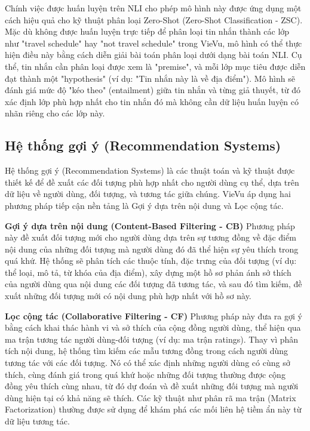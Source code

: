  Chính việc được huấn luyện trên NLI cho phép mô hình này được ứng dụng một cách hiệu quả cho kỹ thuật phân loại Zero-Shot (Zero-Shot Classification - ZSC). Mặc dù không được huấn luyện trực tiếp để phân loại tin nhắn thành các lớp như "travel schedule" hay "not travel schedule" trong VieVu, mô hình có thể thực hiện điều này bằng cách diễn giải bài toán phân loại dưới dạng bài toán NLI. Cụ thể, tin nhắn cần phân loại được xem là "premise", và mỗi lớp mục tiêu được diễn đạt thành một "hypothesis" (ví dụ: "Tin nhắn này là về địa điểm"). Mô hình sẽ đánh giá mức độ "kéo theo" (entailment) giữa tin nhắn và từng giả thuyết, từ đó xác định lớp phù hợp nhất cho tin nhắn đó mà không cần dữ liệu huấn luyện có nhãn riêng cho các lớp này.

\subsection{Hệ thống gợi ý (Recommendation Systems)}
Hệ thống gợi ý (Recommendation Systems) là các thuật toán và kỹ thuật được thiết kế để đề xuất các đối tượng phù hợp nhất cho người dùng cụ thể, dựa trên dữ liệu về người dùng, đối tượng, và tương tác giữa chúng. VieVu áp dụng hai phương pháp tiếp cận nền tảng là Gợi ý dựa trên nội dung và Lọc cộng tác.
 
 \textbf{Gợi ý dựa trên nội dung (Content-Based Filtering - CB)\cite{cb_concept}} 
 Phương pháp này đề xuất đối tượng mới cho người dùng dựa trên sự tương đồng về đặc điểm nội dung của những đối tượng mà người dùng đó đã thể hiện sự yêu thích trong quá khứ. Hệ thống sẽ phân tích các thuộc tính, đặc trưng của đối tượng (ví dụ: thể loại, mô tả, từ khóa của địa điểm), xây dựng một hồ sơ phản ánh sở thích của người dùng qua nội dung các đối tượng đã tương tác, và sau đó tìm kiếm, đề xuất những đối tượng mới có nội dung phù hợp nhất với hồ sơ này.
 
 
 \textbf{Lọc cộng tác (Collaborative Filtering - CF)\cite{cf_concept}} 
 Phương pháp này đưa ra gợi ý bằng cách khai thác hành vi và sở thích của cộng đồng người dùng, thể hiện qua ma trận tương tác người dùng-đối tượng (ví dụ: ma trận ratings). Thay vì phân tích nội dung, hệ thống tìm kiếm các mẫu tương đồng trong cách người dùng tương tác với các đối tượng. Nó có thể xác định những người dùng có cùng sở thích, cùng đánh giá trong quá khứ hoặc những đối tượng thường được cộng đồng yêu thích cùng nhau, từ đó dự đoán và đề xuất những đối tượng mà người dùng hiện tại có khả năng sẽ thích. Các kỹ thuật như phân rã ma trận (Matrix Factorization) thường được sử dụng để khám phá các mối liên hệ tiềm ẩn này từ dữ liệu tương tác.
